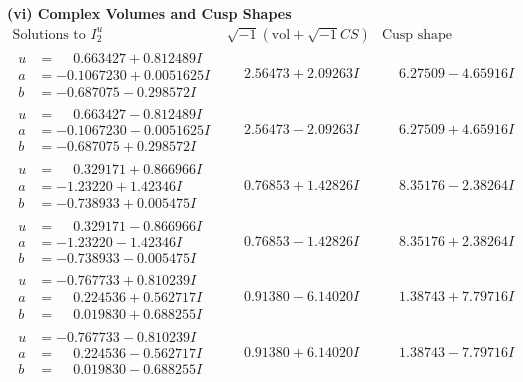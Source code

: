 \documentclass[1p]{elsarticle_modified}
\theoremstyle{definition}
\newcommand{\I}{\sqrt{-1}}
\begin{document}
\newpage\flushleft \textbf{(vi) Complex Volumes and Cusp Shapes}
$$\begin{array}{c|c|c}  
\text{Solutions to }I^u_{2}& \I (\text{vol} + \sqrt{-1}CS) & \text{Cusp shape}\\
 \hline 
\begin{aligned}
u &= \phantom{-}0.663427 + 0.812489 I \\
a &= -0.1067230 + 0.0051625 I \\
b &= -0.687075 - 0.298572 I\end{aligned}
 & \phantom{-}2.56473 + 2.09263 I & \phantom{-}6.27509 - 4.65916 I \\ \hline\begin{aligned}
u &= \phantom{-}0.663427 - 0.812489 I \\
a &= -0.1067230 - 0.0051625 I \\
b &= -0.687075 + 0.298572 I\end{aligned}
 & \phantom{-}2.56473 - 2.09263 I & \phantom{-}6.27509 + 4.65916 I \\ \hline\begin{aligned}
u &= \phantom{-}0.329171 + 0.866966 I \\
a &= -1.23220 + 1.42346 I \\
b &= -0.738933 + 0.005475 I\end{aligned}
 & \phantom{-}0.76853 + 1.42826 I & \phantom{-}8.35176 - 2.38264 I \\ \hline\begin{aligned}
u &= \phantom{-}0.329171 - 0.866966 I \\
a &= -1.23220 - 1.42346 I \\
b &= -0.738933 - 0.005475 I\end{aligned}
 & \phantom{-}0.76853 - 1.42826 I & \phantom{-}8.35176 + 2.38264 I \\ \hline\begin{aligned}
u &= -0.767733 + 0.810239 I \\
a &= \phantom{-}0.224536 + 0.562717 I \\
b &= \phantom{-}0.019830 + 0.688255 I\end{aligned}
 & \phantom{-}0.91380 - 6.14020 I & \phantom{-}1.38743 + 7.79716 I \\ \hline\begin{aligned}
u &= -0.767733 - 0.810239 I \\
a &= \phantom{-}0.224536 - 0.562717 I \\
b &= \phantom{-}0.019830 - 0.688255 I\end{aligned}
 & \phantom{-}0.91380 + 6.14020 I & \phantom{-}1.38743 - 7.79716 I \\ \hline\begin{aligned}

\end{aligned}
\end{array}$$
\end{document}
